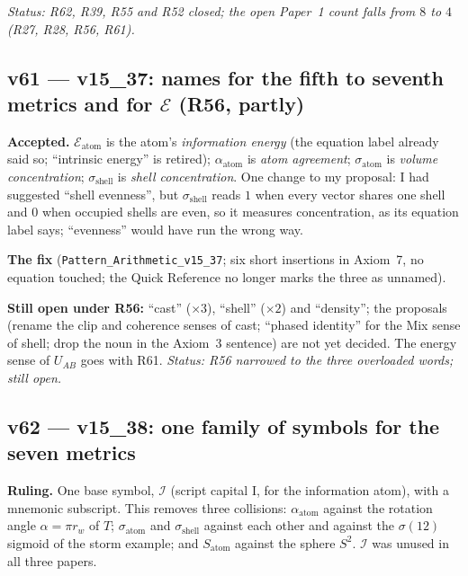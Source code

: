 \documentclass[11pt]{article}
\begin{document}
\emph{Status: R62, R39, R55 and R52 closed; the open Paper~1 count falls from $8$ to $4$ (R27, R28, R56, R61).}

\subsection*{v61 --- v15\_37: names for the fifth to seventh metrics and for $\mathcal E$ (R56, partly)}
\textbf{Accepted.} $\mathcal E_{\text{atom}}$ is the atom's \emph{information energy} (the equation label already said so; ``intrinsic energy'' is retired); $\alpha_{\text{atom}}$ is \emph{atom agreement}; $\sigma_{\text{atom}}$ is \emph{volume concentration}; $\sigma_{\text{shell}}$ is \emph{shell concentration}. One change to my proposal: I had suggested ``shell evenness'', but $\sigma_{\text{shell}}$ reads $1$ when every vector shares one shell and $0$ when occupied shells are even, so it measures concentration, as its equation label says; ``evenness'' would have run the wrong way.

\textbf{The fix} (\texttt{Pattern\_Arithmetic\_v15\_37}; six short insertions in Axiom~7, no equation touched; the Quick Reference no longer marks the three as unnamed).

\textbf{Still open under R56:} ``cast'' ($\times3$), ``shell'' ($\times2$) and ``density''; the proposals (rename the clip and coherence senses of cast; ``phased identity'' for the Mix sense of shell; drop the noun in the Axiom~3 sentence) are not yet decided. The energy sense of $U_{AB}$ goes with R61.
\emph{Status: R56 narrowed to the three overloaded words; still open.}

\subsection*{v62 --- v15\_38: one family of symbols for the seven metrics}
\textbf{Ruling.} One base symbol, $\mathcal I$ (script capital I, for the information atom), with a mnemonic subscript. This removes three collisions: $\alpha_{\text{atom}}$ against the rotation angle $\alpha=\pi r_w$ of $T$; $\sigma_{\text{atom}}$ and $\sigma_{\text{shell}}$ against each other and against the $\sigma(12)$ sigmoid of the storm example; and $S_{\text{atom}}$ against the sphere $S^2$. $\mathcal I$ was unused in all three papers.
\end{document}
